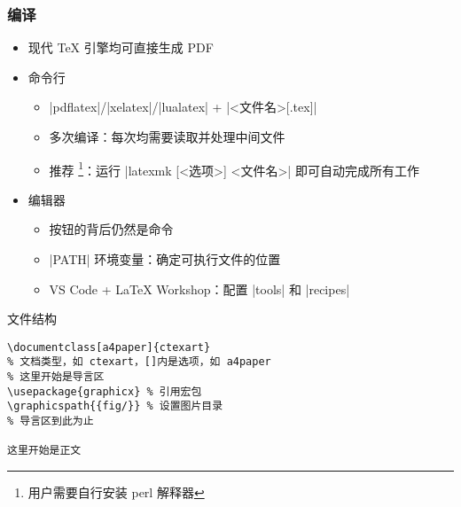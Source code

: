 \begin{frame}[fragile]
  \frametitle{编译}
  \begin{itemize}
    \item 现代 \TeX{} 引擎均可直接生成 PDF
    \item 命令行

          \begin{itemize}
            \item |pdflatex|/|xelatex|/|lualatex| + |<文件名>[.tex]|
            \item 多次编译：每次均需要读取并处理中间文件
            \item 推荐 \footnote{\MiKTeX 用户需要自行安装 perl 解释器}：运行 |latexmk [<选项>] <文件名>| 即可自动完成所有工作
          \end{itemize}

    \item 编辑器

          \begin{itemize}
            \item 按钮的背后仍然是命令
            \item |PATH| 环境变量：确定可执行文件的位置
            \item VS Code + \LaTeX{} Workshop：配置 |tools| 和 |recipes|
          \end{itemize}
  \end{itemize}
\end{frame}


\begin{frame}[fragile]{文件结构}
  \lstset{language=[LaTeX]TeX}
  \begin{lstlisting}[basicstyle=\ttfamily]
\documentclass[a4paper]{ctexart}
% 文档类型，如 ctexart，[]内是选项，如 a4paper
% 这里开始是导言区
\usepackage{graphicx} % 引用宏包
\graphicspath{{fig/}} % 设置图片目录
% 导言区到此为止

这里开始是正文

  \end{lstlisting}
\end{frame}

